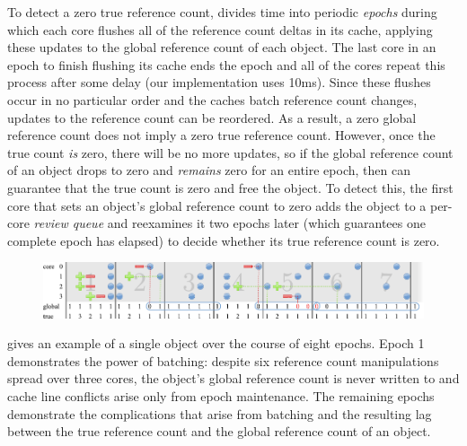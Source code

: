 To detect a zero true reference count,  divides time into
periodic \emph{epochs} during which each core flushes all of the
reference count deltas in its cache, applying these updates to the
global reference count of each object.  The last core in an epoch to
finish flushing its cache ends the epoch and all of the cores repeat
this process after some delay (our implementation uses 10ms).  Since
these flushes occur in no particular order and the caches batch
reference count changes, updates to the reference count can be
reordered.  As a result, a zero global reference count does not imply
a zero true reference count.  However, once the true count \emph{is}
zero, there will be no more updates, so if the global reference count
of an object drops to zero and \emph{remains} zero for an entire
epoch, then  can guarantee that the true count is zero
and free the object.  To detect this, the first core that sets an object's
global reference count to zero adds the object to a per-core
\emph{review queue} and reexamines it two epochs later (which
guarantees one complete epoch has elapsed) to decide whether its true
reference count is zero.

\begin{figure}
  \centering
  \includegraphics[width=\textwidth]{figures/refcache.pdf}
  \label{fig:refcache-ex}
\end{figure}

 gives an example of a single object over
the course of eight epochs.  Epoch 1 demonstrates the power of
batching: despite six reference count manipulations spread over three
cores, the object's global reference count is never written to and
cache line conflicts arise only from epoch maintenance.  The
remaining epochs demonstrate the complications that arise from
batching and the resulting lag between the true reference count and
the global reference count of an object.


